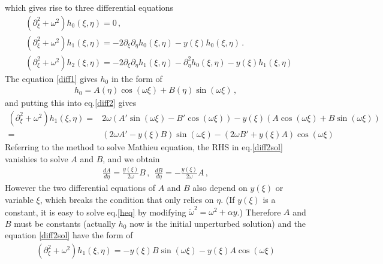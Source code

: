 \documentclass[
 jor,
 amsmath,amssymb,preprint,
]{revtex4-2}
\begin{document}
which gives rise to three differential equations
\begin{align}
& (\partial_\xi^2 + \omega^2) h_0(\xi,\eta) = 0 \label{diff1}\,, \\
& (\partial_\xi^2 + \omega^2) h_1(\xi,\eta) = -2\partial_\xi\partial_\eta h_0(\xi,\eta) - y(\xi)h_0(\xi,\eta)\,. \label{diff2} \\
& (\partial_\xi^2 + \omega^2) h_2(\xi,\eta) = -2\partial_\xi\partial_\eta h_1(\xi,\eta) - \partial_\eta^2 h_0(\xi,\eta) - y(\xi)h_1(\xi,\eta)
\end{align}
The equation \eqref{diff1} gives $h_0$ in the form of
\begin{equation}
\begin{aligned}
h_0 = A(\eta)\cos(\omega\xi) + B(\eta)\sin(\omega\xi) \,, \label{h0}
\end{aligned}
\end{equation}
and putting this into eq.\eqref{diff2} gives
\begin{equation}
\begin{aligned}
(\partial_\xi^2 + \omega^2) h_1(\xi,\eta) = & 2\omega(A'\sin(\omega\xi)-B'\cos(\omega\xi)) - y(\xi)(A\cos(\omega\xi) + B\sin(\omega\xi)) \\
= & (2\omega A' - y(\xi)B)\sin(\omega\xi) - (2\omega B'+ y(\xi)A)\cos(\omega\xi) \label{diff2sol}
\end{aligned}
\end{equation}
Referring to the method to solve Mathieu equation, the RHS in eq.\eqref{diff2sol} vanishies to solve $A$ and $B$, and we obtain
\begin{equation}
\begin{aligned}
\frac{dA}{d\eta} = \frac{y(\xi)}{2\omega}B\,, ~~ \frac{dB}{d\eta} = - \frac{y(\xi)}{2\omega}A\,,
\end{aligned}
\end{equation}
However the two differential equations of $A$ and $B$ also depend on $y(\xi)$ or variable $\xi$, which breaks the condition that only relies on $\eta$. (If $y(\xi)$ is a constant, it is easy to solve eq.\eqref{heq} by modifying $\tilde{\omega}^2 = \omega^2 + \alpha y$.) Therefore $A$ and $B$ must be constants (actually $h_0$ now is the initial unperturbed solution) and the equation \eqref{diff2sol} have the form of
\begin{equation}
\begin{aligned}
(\partial_\xi^2 + \omega^2) h_1(\xi,\eta) = - y (\xi)B\sin(\omega\xi) -  y(\xi)A \cos(\omega\xi) \label{diff2sol2}
\end{aligned}
\end{equation}
\end{document}
